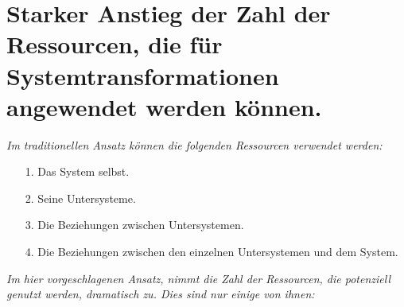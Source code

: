 \documentclass[11pt,a4paper]{article}
\begin{document}
\section*{Starker Anstieg der Zahl der Ressourcen, die für
  Systemtransformationen angewendet werden können.} 

\emph{Im traditionellen Ansatz können die folgenden Ressourcen verwendet
  werden:}
\begin{itemize}[noitemsep]
\item[1.] Das System selbst.
\item[2.] Seine Untersysteme.
\item[3.] Die Beziehungen zwischen Untersystemen.
\item[4.] Die Beziehungen zwischen den einzelnen Untersystemen und dem System.
\end{itemize}
\emph{Im hier vorgeschlagenen Ansatz, nimmt die Zahl der Ressourcen, die
  potenziell genutzt werden, dramatisch zu. Dies sind nur einige von ihnen: }
\end{document}
